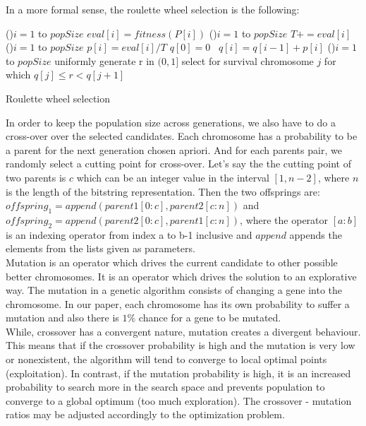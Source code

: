 \documentclass{article}
\begin{document}
In a more formal sense, the roulette wheel selection is the following:\\
\begin{algorithm}[H]
\SetAlgoLined
{}
\For(){$i = 1$ to $popSize$}
{
  $eval[i] = fitness(P[i])$\;
}
\For(){$i = 1$ to $popSize$}
{
  $T += eval[i]$\;
}
\For(){$i = 1$ to $popSize$}
{
  $p[i] = eval[i] / T$\;
}
  $q[0] = 0$\
  {
  $q[i] = q[i - 1] + p[i]$\;
  }
 \For(){$i = 1$ to $popSize$}
 {
 uniformly generate r in $(0, 1]$\;
 select for survival chromosome $j$ for which $q[j] \leq r < q[j+1]$\;
 }
\caption{Roulette wheel selection}
\end{algorithm}
In order to keep the population size across generations, we also have to do a cross-over over the selected candidates. Each chromosome has a probability to be a parent for the next generation chosen apriori. And for each parents pair, we randomly select a cutting point for cross-over. Let's say the the cutting point of two parents is $c$ which can be an integer value in the interval $[1, n-2]$, where $n$ is the length of the bitstring representation. Then the two offsprings are: $offspring_1 = append(parent1[0:c], parent2[c:n])$ and $offspring_2 = append(parent2[0:c], parent1[c:n])$, where the operator $[a:b]$ is an indexing operator from index a to b-1 inclusive and $append$ appends the elements from the lists given as parameters.\\
Mutation is an operator which drives the current candidate to other possible better chromosomes. It is an operator which drives the solution to an explorative way. The mutation in a genetic algorithm consists of changing a gene into the chromosome. In our paper,  each chromosome has its own probability to suffer a mutation and also there is $1\%$ chance for a gene to be mutated.\\
While, crossover has a convergent nature, mutation creates a divergent behaviour. This means that if the crossover probability is high and the mutation is very low or nonexistent, the algorithm will tend to converge to local optimal points (exploitation). In contrast, if the mutation probability is high, it is an increased probability to search more in the search space and prevents population to converge to a global optimum (too much exploration). The crossover - mutation ratios may be adjusted accordingly to the optimization problem.
\end{document}
